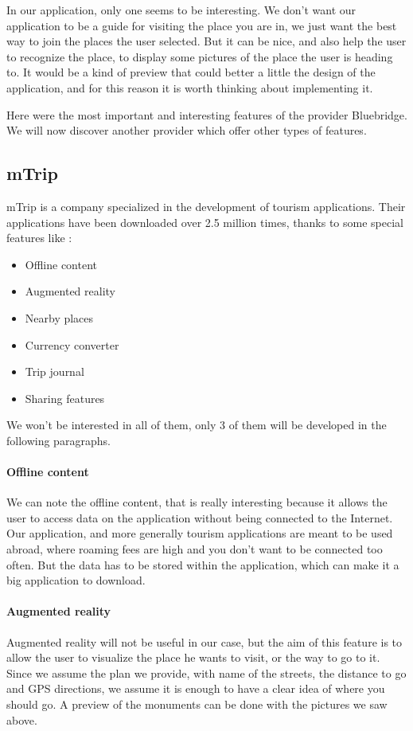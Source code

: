 In our application, only one seems to be interesting. We don't want our application to be a guide for visiting the place you are in, we just want the best way to join the places the user selected. But it can be nice, and also help  the user to recognize the place, to display some pictures of the place the user is heading to. It would be a kind of preview that could better a little the design of the application, and for this reason it is worth thinking about implementing it.


Here were the most important and interesting features of the provider Bluebridge. We will now discover another provider which offer other types of features.

\newpage{}\subsection{mTrip}
mTrip is a company specialized in the development of tourism applications. Their applications have been downloaded over 2.5 million times, thanks to some special features like :
\begin{itemize}
	\item Offline content
	\item Augmented reality
  \item Nearby places
  \item Currency converter
  \item Trip journal
  \item Sharing features
\end{itemize}

We won't be interested in all of them, only 3 of them will be developed in the following paragraphs.

\paragraph{Offline content} We can note the offline content, that is really interesting because it allows the user to access data on the application without being connected to the Internet. Our application, and more generally tourism applications are meant to be used abroad, where roaming fees are high and you don't want to be connected too often. But the data has to be stored within the application, which can make it a big application to download.


\paragraph{Augmented reality} Augmented reality will not be useful in our case, but the aim of this feature is to allow the user to visualize the place he wants to visit, or the way to go to it. Since we assume the plan we provide, with name of the streets, the distance to go and GPS directions, we assume it is enough to have a clear idea of where you should go. A preview of the monuments can be done with the pictures we saw above.


